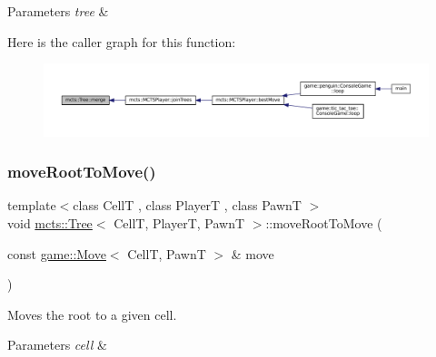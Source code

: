 \begin{DoxyParams}{Parameters}
{\em tree} & \\
\hline
\end{DoxyParams}
Here is the caller graph for this function\+:
\nopagebreak
\begin{figure}[H]
\begin{center}
\leavevmode
\includegraphics[width=350pt]{classmcts_1_1_tree_a06139b9922488bb26feb25745e54e508_icgraph}
\end{center}
\end{figure}
\mbox{\label{classmcts_1_1_tree_abe24265d4d862d951163be405384f2b3}} 
\subsubsection{\texorpdfstring{move\+Root\+To\+Move()}{moveRootToMove()}}
{\footnotesize\ttfamily template$<$class CellT , class PlayerT , class PawnT $>$ \\
void \hyperlink{classmcts_1_1_tree}{mcts\+::\+Tree}$<$ CellT, PlayerT, PawnT $>$\+::move\+Root\+To\+Move (\begin{DoxyParamCaption}\item[{const \hyperlink{structgame_1_1_move}{game\+::\+Move}$<$ CellT, PawnT $>$ \&}]{move }\end{DoxyParamCaption})}



Moves the root to a given cell. 


\begin{DoxyParams}{Parameters}
{\em cell} & \\
\hline
\end{DoxyParams}
\mbox{\label{classmcts_1_1_tree_a2cf4616df96cb68014ebd8fa6d0aebc4}} 

